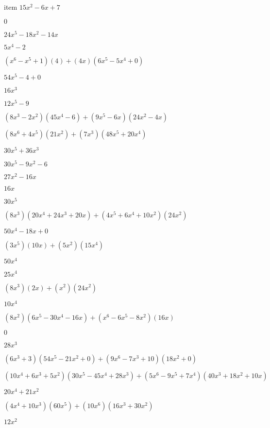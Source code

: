 \documentclass{article}
\begin{document}
\begin{multicols}{2}
item $15x^{2}-6x+7$\item $0$\item $24x^{5}-18x^{2}-14x$\item $5x^{4}-2$\item $(x^{6}-x^{5}+1)(4)+(4x)(6x^{5}-5x^{4}+0)$\item $54x^{5}-4+0$\item $16x^{3}$\item $12x^{5}-9$\item $(8x^{3}-2x^2)(45x^{4}-6)+(9x^{5}-6x)(24x^{2}-4x)$\item $(8x^{6}+4x^{5})(21x^{2})+(7x^{3})(48x^{5}+20x^{4})$\item $30x^{5}+36x^{3}$\item $30x^{5}-9x^{2}-6$\item $27x^{2}-16x$\item $16x$\item $30x^{5}$\item $(8x^{3})(20x^{4}+24x^{3}+20x)+(4x^{5}+6x^{4}+10x^2)(24x^{2})$\item $50x^{4}-18x+0$\item $(3x^{5})(10x)+(5x^2)(15x^{4})$\item $50x^{4}$\item $25x^{4}$\item $(8x^{3})(2x)+(x^2)(24x^{2})$\item $10x^{4}$\item $(8x^2)(6x^{5}-30x^{4}-16x)+(x^{6}-6x^{5}-8x^2)(16x)$\item $0$\item $28x^{3}$\item $(6x^{3}+3)(54x^{5}-21x^{2}+0)+(9x^{6}-7x^{3}+10)(18x^{2}+0)$\item $(10x^{4}+6x^{3}+5x^2)(30x^{5}-45x^{4}+28x^{3})+(5x^{6}-9x^{5}+7x^{4})(40x^{3}+18x^{2}+10x)$\item $20x^{4}+21x^{2}$\item $(4x^{4}+10x^{3})(60x^{5})+(10x^{6})(16x^{3}+30x^{2})$\item $12x^{2}$\item 
\end{multicols}
\end{document}
